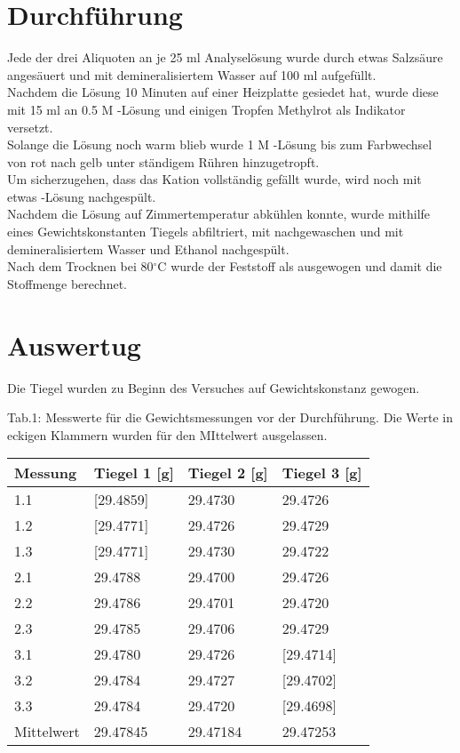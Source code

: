 \documentclass[12pt]{scrartcl} %
\newcommand{\celsius}{^{\circ}\mathrm{C}} %
\begin{document}
\section{Durchführung}
Jede der drei Aliquoten an je 25 ml Analyselösung wurde durch etwas Salzsäure angesäuert und mit demineralisiertem Wasser auf 100 ml aufgefüllt.\\
Nachdem die Lösung 10 Minuten auf einer Heizplatte gesiedet hat, wurde diese mit 15 ml an 0.5 M -Lösung und einigen Tropfen Methylrot als Indikator versetzt.\\
Solange die Lösung noch warm blieb wurde 1 M -Lösung bis zum Farbwechsel von rot nach gelb unter ständigem Rühren hinzugetropft.\\
Um sicherzugehen, dass das Kation vollständig gefällt wurde, wird noch mit etwas -Lösung nachgespült.\\
Nachdem die Lösung auf Zimmertemperatur abkühlen konnte, wurde mithilfe eines Gewichtskonstanten Tiegels abfiltriert, mit  nachgewaschen und mit demineralisiertem Wasser und Ethanol nachgespült.\\
Nach dem Trocknen bei 80$\celsius$ wurde der Feststoff als  ausgewogen und damit die Stoffmenge berechnet.\\

\newpage

\section{Auswertug}
Die Tiegel wurden zu Beginn des Versuches auf Gewichtskonstanz gewogen.
\begin{center}
  Tab.1: Messwerte für die Gewichtsmessungen vor der Durchführung. Die Werte in eckigen Klammern wurden für den MIttelwert ausgelassen.\\
  \begin{tabular}{l l l l}
      \hline
      Messung & Tiegel 1 [g] & Tiegel 2 [g] & Tiegel 3 [g]\\
      \hline
      1.1&[29.4859]&29.4730&29.4726\\
      1.2&[29.4771]&29.4726&29.4729\\
      1.3&[29.4771]&29.4730&29.4722\\
      2.1&29.4788&29.4700&29.4726\\
      2.2&29.4786&29.4701&29.4720\\
      2.3&29.4785&29.4706&29.4729\\
      3.1&29.4780&29.4726&[29.4714]\\
      3.2&29.4784&29.4727&[29.4702]\\
      3.3&29.4784&29.4720&[29.4698]\\
      \hline
      Mittelwert&29.47845&29.47184&29.47253\\
      \hline
  \end{tabular}
\end{center}
\end{document}
